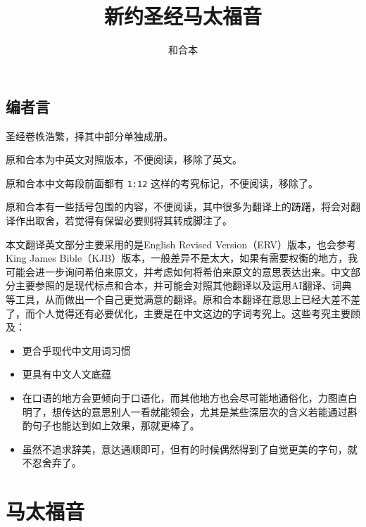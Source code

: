 \documentclass[12pt,oneside]{book}
\title{新约圣经马太福音}
\author{和合本}
\begin{document}




\frontmatter


\chapter*{编者言}
圣经卷帙浩繁，择其中部分单独成册。

原和合本为中英文对照版本，不便阅读，移除了英文。

原和合本中文每段前面都有 \verb+1:12+ 这样的考究标记，不便阅读，移除了。

原和合本有一些括号包围的内容，不便阅读，其中很多为翻译上的踌躇，将会对翻译作出取舍，若觉得有保留必要则将其转成脚注了。

本文翻译英文部分主要采用的是English Revised Version（ERV）版本，也会参考King James Bible（KJB）版本，一般差异不是太大，如果有需要权衡的地方，我可能会进一步询问希伯来原文，并考虑如何将希伯来原文的意思表达出来。中文部分主要参照的是现代标点和合本，并可能会对照其他翻译以及运用AI翻译、词典等工具，从而做出一个自己更觉满意的翻译。原和合本翻译在意思上已经大差不差了，而个人觉得还有必要优化，主要是在中文这边的字词考究上。这些考究主要顾及：


\begin{itemize}
\item 更合乎现代中文用词习惯
\item 更具有中文人文底蕴
\item 在口语的地方会更倾向于口语化，而其他地方也会尽可能地通俗化，力图直白明了，想传达的意思别人一看就能领会，尤其是某些深层次的含义若能通过斟酌句子也能达到如上效果，那就更棒了。
\item 虽然不追求辞美，意达通顺即可，但有的时候偶然得到了自觉更美的字句，就不忍舍弃了。
\end{itemize}




\setcounter{tocdepth}{2}    
\tableofcontents

\mainmatter
\part{马太福音}
\end{document}
